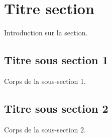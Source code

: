 %

\section{Titre section}
\label{sec:titresection}

Introduction sur la section.

\subsection{Titre sous section 1}
\label{subsec:titresection:titresoussection1}

Corps de la sous-section 1.


\subsection{Titre sous section 2}
\label{subsec:titresection:titresoussection2}

Corps de la sous-section 2.

